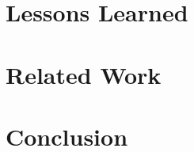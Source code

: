 \documentclass[sigconf, nonacm, table]{acmart}
\begin{document}
\vspace*{-3mm}
\section{Lessons Learned}
\label{sec:lessons-learned}


\vspace*{-4mm}
\section{Related Work}
\label{sec:related-work}


\section{Conclusion}
\label{sec:conclusion}






\end{document}
